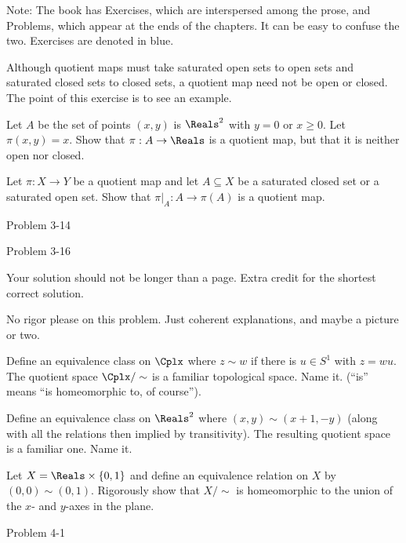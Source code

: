 \documentclass[minion]{homework651}
\begin{document}
Note: The book has Exercises, which are interspersed among the
prose, and Problems, which appear at the ends of the chapters.
It can be easy to confuse the two.  Exercises are denoted in blue.


\begin{problems}


\problem
Although quotient maps must take saturated open sets to open sets
and saturated closed sets to closed sets, a quotient map need not be open or closed.  The point of this exercise is to see an example.

Let $A$ be the set of points $(x,y)$ is $\Reals^2$ with $y=0$ or $x\ge 0$.  Let $\pi(x,y)=x$.
Show that $\pi:A\rightarrow\Reals$ is a quotient map, but that it is neither open nor closed.

\problem
Let $\pi:X\rightarrow Y$ be a quotient map and let $A\subseteq X$
be a saturated closed set or a saturated open set.  Show that $\pi|_A:A\rightarrow \pi(A)$
is a quotient map.

\problem Problem 3-14

\problem Problem 3-16

Your solution should not be longer than a page.  Extra credit for the
shortest correct solution.

\problem
No rigor please on this problem.  Just coherent explanations, and maybe a picture or two.
\begin{subproblems}
\item Define an equivalence class on $\Cplx$ where $z\sim w$ if there is $u\in S^1$ with
$z=wu$.  The quotient space $\Cplx/\sim$ is a familiar topological space.  Name it.
 (``is'' means ``is homeomorphic to, of course''). 
\item Define an equivalence class on $\Reals^2$ where $(x,y)\sim (x+1,-y)$ (along with all the relations then implied by transitivity).  The resulting quotient space is a familiar one.  Name it.
\end{subproblems}


\problem
Let $X=\Reals\times\{0,1\}$ and define an equivalence
relation on $X$ by $(0,0)\sim(0,1)$.  Rigorously show that $X/\sim$
is homeomorphic to the union of the $x$- and $y$-axes in the plane.

\problem Problem 4-1

\problem {}
\end{problems}
\end{document}
